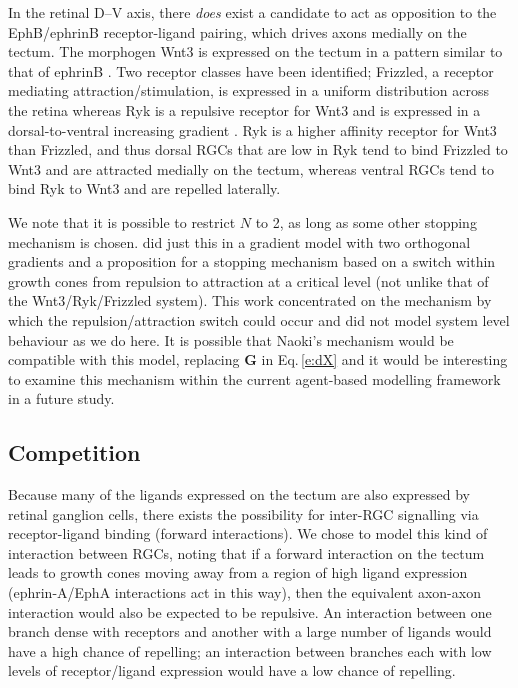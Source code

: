 \documentclass[9pt,lineno,draft]{elife}
\begin{document}
In the retinal D--V axis, there \emph{does} exist a candidate to act as opposition to the EphB/ephrinB receptor-ligand pairing, which drives axons medially on the tectum.
The morphogen Wnt3 is expressed on the tectum in a pattern similar to that of ephrinB \citep{schmitt_wntryk_2006}.
Two receptor classes have been identified; Frizzled, a receptor mediating attraction/stimulation, is expressed in a uniform distribution across the retina whereas Ryk is a repulsive receptor for Wnt3 and is expressed in a dorsal-to-ventral increasing gradient \citep{schmitt_wntryk_2006}. Ryk is a higher affinity receptor for Wnt3 than Frizzled, and thus dorsal RGCs that are low in Ryk tend to bind Frizzled to Wnt3 and are attracted medially on the tectum, whereas ventral RGCs tend to bind Ryk to Wnt3 and are repelled laterally.

We note that it is possible to restrict $N$ to 2, as long as some other stopping mechanism is chosen.
\citet{naoki_revisiting_2017} did just this in a gradient model with two orthogonal gradients and a proposition for a stopping mechanism based on a switch within growth cones from repulsion to attraction at a critical level (not unlike that of the Wnt3/Ryk/Frizzled system).
This work concentrated on the mechanism by which the repulsion/attraction switch could occur and did not model system level behaviour as we do here.
It is possible that Naoki's mechanism would be compatible with this model, replacing $\mathbf{G}$ in Eq.\,\ref{e:dX} and it would be interesting to examine this mechanism within the current agent-based modelling framework in a future study.

\subsection*{Competition}

Because many of the ligands expressed on the tectum are also expressed by retinal ganglion cells, there exists the possibility for inter-RGC signalling via receptor-ligand binding (forward interactions).
We chose to model this kind of interaction between RGCs, noting that if a forward interaction on the tectum leads to growth cones moving away from a region of high ligand expression (ephrin-A/EphA interactions act in this way), then the equivalent axon-axon interaction would also be expected to be repulsive. An interaction between one branch dense with receptors and another with a large number of ligands would have a high chance of repelling; an interaction between branches each with low levels of receptor/ligand expression would have a low chance of repelling.
\end{document}
